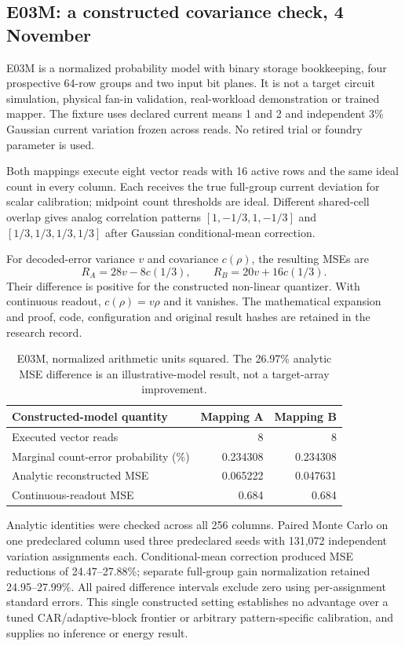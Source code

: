 \subsection{E03M: a constructed covariance check, 4 November}

E03M is a normalized probability model with \target{} binary storage bookkeeping,
four prospective 64-row groups and two input bit planes. It is not a target circuit
simulation, physical fan-in validation, real-workload demonstration or trained mapper.
The fixture uses declared current means 1 and 2 and independent 3\% Gaussian current
variation frozen across reads. No retired trial or foundry parameter is used.

Both mappings execute eight vector reads with 16 active rows and the same ideal count
in every column. Each receives the true full-group current deviation for scalar
calibration; midpoint count thresholds are ideal. Different shared-cell overlap gives
analog correlation patterns $[1,-1/3,1,-1/3]$ and $[1/3,1/3,1/3,1/3]$ after Gaussian
conditional-mean correction.

For decoded-error variance $v$ and covariance $c(\rho)$, the resulting MSEs are
\begin{equation}
 R_A=28v-8c(1/3),\qquad R_B=20v+16c(1/3).
\end{equation}
Their difference is positive for the constructed non-linear quantizer. With continuous
readout, $c(\rho)=v\rho$ and it vanishes. The mathematical expansion and proof, code,
configuration and original result hashes are retained in the research record.

\begin{table}[htbp]\centering\small
\begin{tabular}{@{}lrr@{}}\toprule
Constructed-model quantity & Mapping A & Mapping B\\\midrule
Executed vector reads & 8 & 8\\
Marginal count-error probability (\%) & 0.234308 & 0.234308\\
Analytic reconstructed MSE & 0.065222 & 0.047631\\
Continuous-readout MSE & 0.684 & 0.684\\\bottomrule
\end{tabular}
\caption{E03M, normalized arithmetic units squared. The 26.97\% analytic MSE
difference is an illustrative-model result, not a target-array improvement.}
\end{table}

Analytic identities were checked across all 256 columns. Paired Monte Carlo on one
predeclared column used three predeclared seeds with 131,072 independent variation
assignments each. Conditional-mean correction produced MSE reductions of 24.47--27.88\%;
separate full-group gain normalization retained 24.95--27.99\%. All paired difference
intervals exclude zero using per-assignment standard errors. This single constructed
setting establishes no advantage over a tuned CAR/adaptive-block frontier or arbitrary
pattern-specific calibration, and supplies no inference or energy result.

